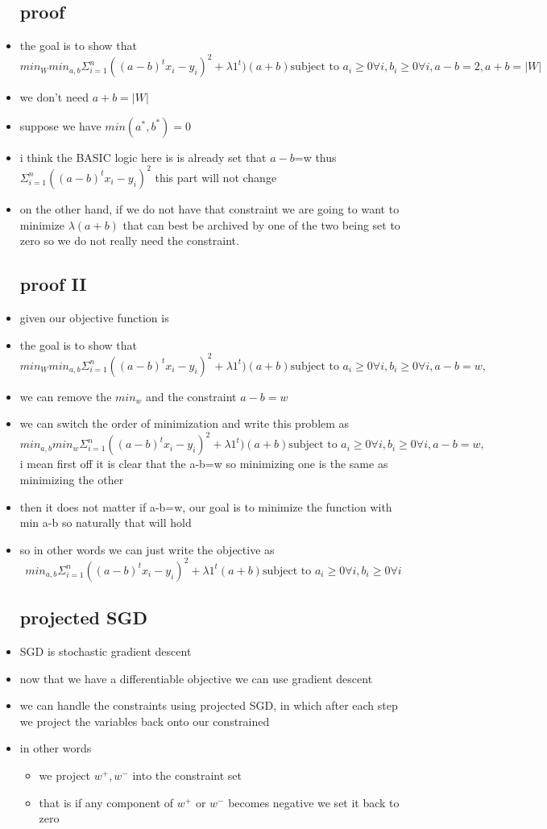 \documentclass{article}
\begin{document}
\begin{itemize}
\subsection{proof}
\item the goal is to show that $$min_{W}min_{a,b}\Sigma_{i=1}^{n}((a-b)^t x_i-y_i)^{2}+\lambda 1^{t})(a+b) \text{subject to }a_i\geq 0 \forall i, b_i\geq 0 \forall i , a-b=2, a+b=|W|$$
\item  we don't need $a+b=|W|$
\item suppose we have $min(a^{*}, b^{*})=0$ 
\item i think the BASIC logic here is is already set that $a-b$=w thus$\Sigma_{i=1}^{n}((a-b)^t x_i-y_i)^{2}$ this part will not change 
\item on the other hand, if we do not have that constraint we are going to want to minimize $\lambda (a+b)$ that can best be archived by one of the two being set to zero so we do not really need the constraint. 
\subsection{proof II}
\item given our objective function  is \item the goal is to show that $$min_{W}min_{a,b}\Sigma_{i=1}^{n}((a-b)^t x_i-y_i)^{2}+\lambda 1^{t})(a+b) \text{subject to }a_i\geq 0 \forall i, b_i\geq 0 \forall i , a-b=w,$$
\item we can remove the $min_{w}$ and the constraint $a-b=w$
\item we can switch the order of minimization and write this problem as $$min_{a,b}min_{w}\Sigma_{i=1}^{n}((a-b)^t x_i-y_i)^{2}+\lambda 1^{t})(a+b) \text{subject to }a_i\geq 0 \forall i, b_i\geq 0 \forall i , a-b=w,$$ i mean first off it is clear that the a-b=w so minimizing one is the same as minimizing the other 
\item then it does not matter if a-b=w, our goal is to minimize the function with min a-b so naturally that will hold 
\item so in other words we can just write the objective as $$min_{a,b}\Sigma_{i=1}^{n}((a-b)^t x_i-y_i)^{2}+\lambda 1^{t}(a+b) \text{subject to }a_i\geq 0 \forall i, b_i\geq 0 \forall i$$
\subsection{projected SGD}
\item SGD is stochastic gradient descent 
\item now that we have a differentiable objective we can use gradient descent 
\item we can handle the constraints using projected SGD, in which after each step we project the variables back onto our constrained 
\item in other words
\begin{itemize}
    \item we project $w^{+},w^{-}$ into the constraint set 
    \item that is if any component of $w^{+}$ or $w^{-}$ becomes negative we set it back to zero
\end{itemize}

\end{itemize}
\end{document}
